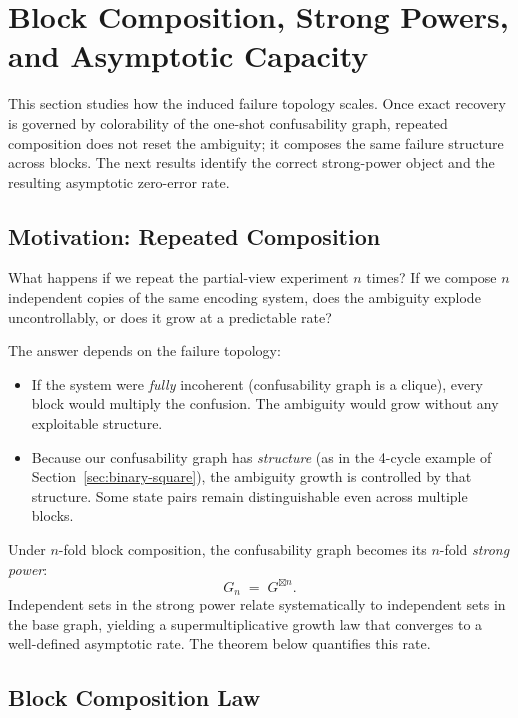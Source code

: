 \section{Block Composition, Strong Powers, and Asymptotic Capacity}\label{sec:capacity-theory}


This section studies how the induced failure topology scales. Once exact recovery is governed by colorability of the one-shot confusability graph, repeated composition does not reset the ambiguity; it composes the same failure structure across blocks. The next results identify the correct strong-power object and the resulting asymptotic zero-error rate.

\subsection{Motivation: Repeated Composition}

What happens if we repeat the partial-view experiment $n$ times? If we compose $n$ independent copies of the same encoding system, does the ambiguity explode uncontrollably, or does it grow at a predictable rate?

The answer depends on the failure topology:
\begin{itemize}
\item If the system were \emph{fully} incoherent (confusability graph is a clique), every block would multiply the confusion. The ambiguity would grow without any exploitable structure.
\item Because our confusability graph has \emph{structure} (as in the 4-cycle example of Section~\ref{sec:binary-square}), the ambiguity growth is controlled by that structure. Some state pairs remain distinguishable even across multiple blocks.
\end{itemize}

Under $n$-fold block composition, the confusability graph becomes its $n$-fold \emph{strong power}:
\[
G_n \;=\; G^{\boxtimes n}.
\]
Independent sets in the strong power relate systematically to independent sets in the base graph, yielding a supermultiplicative growth law that converges to a well-defined asymptotic rate. The theorem below quantifies this rate.

\subsection{Block Composition Law}

